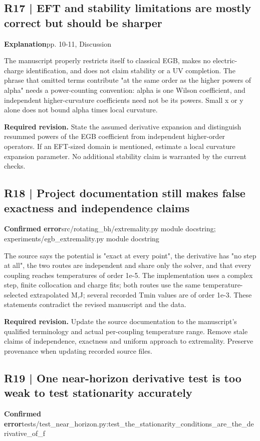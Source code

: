 \documentclass[10pt,a4paper]{article}
\begin{document}
\subsection*{R17 | EFT and stability limitations are mostly correct but should be sharper}
\textbf{Explanation}\quad pp. 10-11, Discussion

The manuscript properly restricts itself to classical EGB, makes no electric-charge identification, and does not claim stability or a UV completion. The phrase that omitted terms contribute "at the same order as the higher powers of alpha" needs a power-counting convention: alpha is one Wilson coefficient, and independent higher-curvature coefficients need not be its powers. Small x or y alone does not bound alpha times local curvature.

\textbf{Required revision.} State the assumed derivative expansion and distinguish resummed powers of the EGB coefficient from independent higher-order operators. If an EFT-sized domain is mentioned, estimate a local curvature expansion parameter. No additional stability claim is warranted by the current checks.

\subsection*{R18 | Project documentation still makes false exactness and independence claims}
\textbf{Confirmed error}\quad src/rotating\_bh/extremality.py module docstring; experiments/egb\_extremality.py module docstring

The source says the potential is "exact at every point", the derivative has "no step at all", the two routes are independent and share only the solver, and that every coupling reaches temperatures of order 1e-5. The implementation uses a complex step, finite collocation and charge fits; both routes use the same temperature-selected extrapolated M,J; several recorded Tmin values are of order 1e-3. These statements contradict the revised manuscript and the data.

\textbf{Required revision.} Update the source documentation to the manuscript's qualified terminology and actual per-coupling temperature range. Remove stale claims of independence, exactness and uniform approach to extremality. Preserve provenance when updating recorded source files.

\subsection*{R19 | One near-horizon derivative test is too weak to test stationarity accurately}
\textbf{Confirmed error}\quad tests/test\_near\_horizon.py:test\_the\_stationarity\_conditions\_are\_the\_derivative\_of\_f
\end{document}
